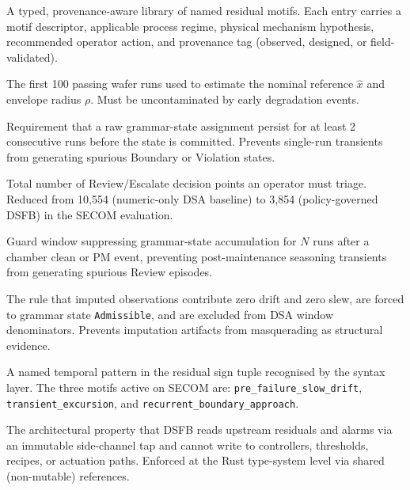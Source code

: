 \documentclass[11pt,letterpaper]{article}
\theoremstyle{scresult}
\begin{document}
\begin{description}[leftmargin=2.4cm, labelwidth=2.2cm, style=nextline,
                    itemsep=4pt, parsep=0pt]
\item[\textbf{Heuristics bank} ($\mathcal{H}$)]
A typed, provenance-aware library of named residual motifs.  Each entry
carries a motif descriptor, applicable process regime, physical mechanism
hypothesis, recommended operator action, and provenance tag (observed,
designed, or field-validated).

\item[\textbf{Healthy window}]
The first 100 passing wafer runs used to estimate the nominal reference
$\hat{x}$ and envelope radius $\rho$.  Must be uncontaminated by early
degradation events.

\item[\textbf{Hysteresis confirmation}]
Requirement that a raw grammar-state assignment persist for at least 2
consecutive runs before the state is committed.  Prevents single-run
transients from generating spurious Boundary or Violation states.

\item[\textbf{Investigation load}]
Total number of Review/Escalate decision points an operator must triage.
Reduced from 10,554 (numeric-only DSA baseline) to 3,854 (policy-governed
DSFB) in the SECOM evaluation.

\item[\textbf{Maintenance hysteresis}]
Guard window suppressing grammar-state accumulation for $N$ runs after a
chamber clean or PM event, preventing post-maintenance seasoning transients
from generating spurious Review episodes.

\item[\textbf{Missingness-aware signal validity}]
The rule that imputed observations contribute zero drift and zero slew, are
forced to grammar state \texttt{Admissible}, and are excluded from DSA
window denominators.  Prevents imputation artifacts from masquerading as
structural evidence.

\item[\textbf{Motif}]
A named temporal pattern in the residual sign tuple recognised by the syntax
layer.  The three motifs active on SECOM are:
\texttt{pre\_failure\_slow\_drift},
\texttt{transient\_excursion}, and
\texttt{recurrent\_boundary\_approach}.

\item[\textbf{Non-intrusive integration}]
The architectural property that DSFB reads upstream residuals and alarms via
an immutable side-channel tap and cannot write to controllers, thresholds,
recipes, or actuation paths.  Enforced at the Rust type-system level via
shared (non-mutable) references.


\end{description}
\end{document}
